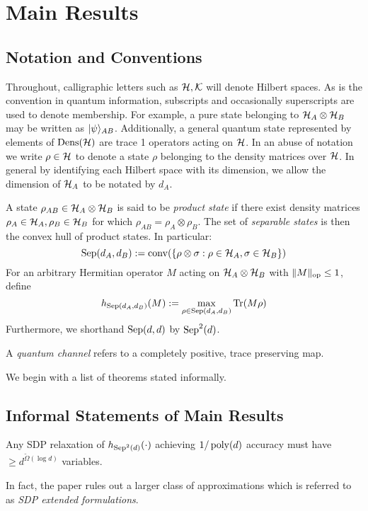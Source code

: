 \documentclass[runningheads,a4paper,english]{llncs}[2022/01/12]
\begin{document}
\section{Main Results}
\label{sec:mainresults}
\subsection{Notation and Conventions}
\label{sec:notation}
Throughout, calligraphic letters such as $\mathcal{H}, \mathcal{K}$ will denote Hilbert spaces.
As is the convention in quantum information, subscripts and occasionally superscripts are used to denote membership.
For example, a pure state belonging to $\mathcal{H}_A \otimes \mathcal{H}_B$ may be written as $\lvert\psi\rangle_{AB}$.
Additionally, a general quantum state represented by elements of $\operatorname{Dens}(\mathcal{H})$ are trace 1 operators acting on $\mathcal{H}$.
In an abuse of notation we write $\rho \in \mathcal{H}$ to denote a state $\rho$ belonging to the density matrices over $\mathcal{H}$.
In general by identifying each Hilbert space with its dimension, we allow the dimension of $\mathcal{H}_A$ to be notated by $d_A$.

A state $\rho_{AB} \in \mathcal{H}_A \otimes \mathcal{H}_B$ is said to be \textit{product state} if there exist density matrices $\rho_A \in \mathcal{H}_A, \rho_B \in \mathcal{H}_B$ for which $\rho_{AB} = \rho_A \otimes \rho_B$.
The set of \textit{separable states} is then the convex hull of product states.
In particular:
\[\operatorname{Sep}(d_A, d_B) := \operatorname{conv}(\{\rho \otimes \sigma : \rho \in \mathcal{H}_A, \sigma \in \mathcal{H}_B\})\]
For an arbitrary Hermitian operator $M$ acting on $\mathcal{H}_A \otimes \mathcal{H}_B$ with $\lVert M\rVert_{\text{op}} \le 1$, define
\[h_{\operatorname{Sep}(d_A, d_B)}(M) := \max_{\rho\in \operatorname{Sep}(d_A, d_B)} \operatorname{Tr}(M\rho)\]
Furthermore, we shorthand $\operatorname{Sep}(d, d)$ by $\operatorname{Sep}^2(d)$.

A \textit{quantum channel} refers to a completely positive, trace preserving map.

We begin with a list of theorems stated informally.
\subsection{Informal Statements of Main Results}
\label{sec:informalmain}
\begin{theorem}
Any SDP relaxation of $h_{\operatorname{Sep}^2(d)}(\cdot)$ achieving $1/\operatorname{poly}(d)$ accuracy must have $\ge d^{\tilde{\Omega}(\log d)}$ variables.
\end{theorem}
In fact, the paper rules out a larger class of approximations which is referred to as \textit{SDP extended formulations}.
\end{document}
